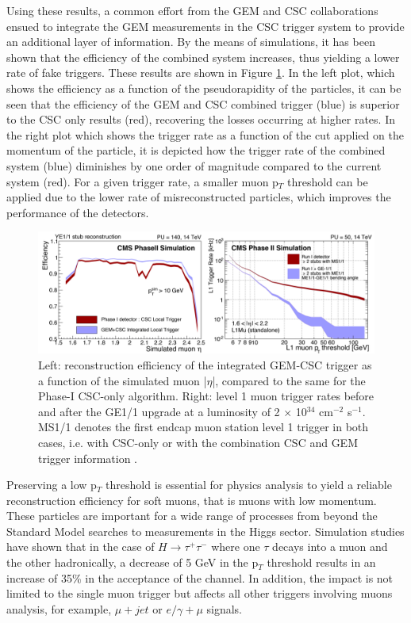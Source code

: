     Using these results, a common effort from the GEM and CSC collaborations ensued to integrate the GEM measurements in the CSC trigger system to provide an additional layer of information. By the means of simulations, it has been shown that the efficiency of the combined system increases, thus yielding a lower rate of fake triggers. These results are shown in Figure \ref{fig:II-1-trigger}. In the left plot, which shows the efficiency as a function of the pseudorapidity of the particles, it can be seen that the efficiency of the GEM and CSC combined trigger (blue) is superior to the CSC only results (red), recovering the losses occurring at higher rates. In the right plot which shows the trigger rate as a function of the cut applied on the momentum of the particle, it is depicted how the trigger rate of the combined system (blue) diminishes by one order of magnitude compared to the current system (red). For a given trigger rate, a smaller muon p$_T$ threshold can be applied due to the lower rate of misreconstructed particles, which improves the performance of the detectors. \\

    \begin{figure}[t!]
      \centering
      \includegraphics[width=\textwidth]{img/II-1-gem/gem-csc-efficiency.pdf}
      \caption{Left: reconstruction efficiency of the integrated GEM-CSC trigger as a function of the simulated muon |$\eta$|, compared to the same for the Phase-I CSC-only algorithm. Right: level 1 muon trigger rates before and after the GE1/1 upgrade at a luminosity of 2 $\times$ 10$^{34}$ cm$^{-2}$ s$^{-1}$. MS1/1 denotes the first endcap muon station level 1 trigger in both cases, i.e. with CSC-only or with the combination CSC and GEM trigger information \cite{Colaleo:2021453}.}
      \label{fig:II-1-trigger}
    \end{figure}

    Preserving a low p$_T$ threshold is essential for physics analysis to yield a reliable reconstruction efficiency for soft muons, that is muons with low momentum. These particles are important for a wide range of processes from beyond the Standard Model searches to measurements in the Higgs sector. Simulation studies have shown that in the case of $ H \rightarrow \tau^+ \tau^- $ where one $ \tau $ decays into a muon and the other hadronically, a decrease of 5 GeV in the p$_T$ threshold results in an increase of 35\% in the acceptance of the channel. In addition, the impact is not limited to the single muon trigger but affects all other triggers involving muons analysis, for example, $\mu+jet$ or $e/\gamma+\mu$ signals. \\


